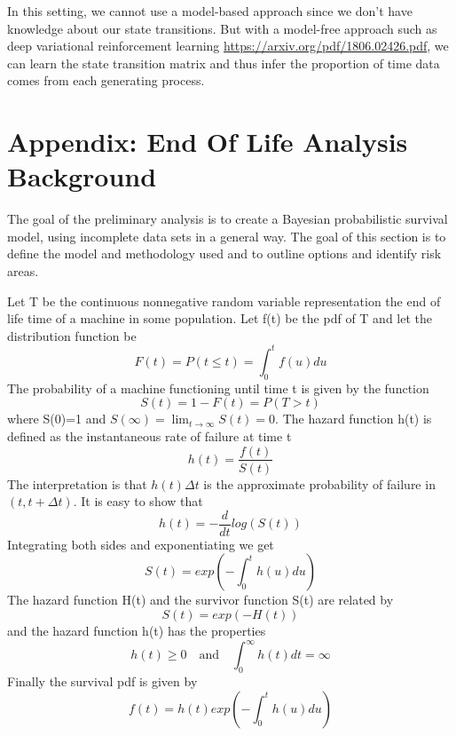 \documentclass[english]{article}
\numberwithin{equation}{section}
\begin{document}
In this setting, we cannot use a model-based approach since we don't have knowledge about our state transitions. But with a model-free approach such as deep variational reinforcement learning \url{https://arxiv.org/pdf/1806.02426.pdf}, we can learn the state transition matrix and thus infer the proportion of time data comes from each generating process.

\section*{Appendix: End Of Life Analysis Background}
The goal of the preliminary analysis is to create a Bayesian probabilistic survival model, using incomplete data sets in a general way.  The goal of this section is to define the model and methodology used and to outline options and identify risk areas.

Let T be the continuous nonnegative random variable representation the end of life time of a machine in some population.  Let f(t) be the pdf of T and let the distribution function be
\begin{equation}
F(t) = P( t \le t) = \int_0^t f(u) du
\end{equation}
The probability of a machine functioning until time t is given by the function
\begin{equation}
S(t) = 1 - F(t)=P(T>t)
\end{equation}
where S(0)=1 and $S(\infty)=\lim_{t \rightarrow \infty} S(t)=0$.  The hazard function h(t) is defined as the instantaneous rate of failure at time t
\begin{equation}
h(t)=\frac{f(t)}{S(t)}
\end{equation}
The interpretation is that $h(t)\Delta t$ is the approximate probability of failure in $(t, t+\Delta t)$.  It is easy to show that
\begin{equation}
h(t)=-\frac{d}{dt}log(S(t))
\end{equation}
Integrating both sides and exponentiating we get
\begin{equation}
S(t)=exp(-\int_0^t h(u) du)
\end{equation}
The hazard function H(t) and the survivor function S(t) are related by
\begin{equation}
S(t)=exp(-H(t))
\end{equation}
and the hazard function h(t) has the properties
\begin{equation}
h(t) \ge 0 \quad  \text{and} \quad  \int_0^\infty h(t)dt = \infty
\end{equation}
Finally the survival pdf is given by
\begin{equation}
f(t)=h(t)exp(-\int_0^t h(u) du)
\end{equation}
\end{document}
